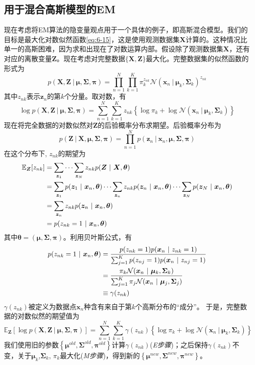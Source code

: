 \documentclass[11pt]{ctexbook}
\begin{document}
\subsection{用于混合高斯模型的EM}
现在考虑将EM算法的隐变量观点用于一个具体的例子，即高斯混合模型。我们的目标是最大化对数似然函数\ref{eq:6-15}，这是使用观测数据集$\bm X$计算的。这种情况比单一的高斯困难，因为求和出现在了对数运算内部。假设除了观测数据集$\bm X$，还有对应的离散变量$\bm Z$。现在考虑对完整数据$\{\bm X, \bm Z\}$最大化。完整数据集的似然函数的形式为
\begin{equation}
	p(\bm X, \bm Z\ |\ \bm \mu, \bm \Sigma, \bm \pi) = \prod_{n=1}^{N}\prod_{k=1}^{K}\pi_k^{z_{nk}}\mathcal N(\bm x_n\ |\ \bm\mu_k, \bm\Sigma_k)^{z_{nk}}
\end{equation}
其中$z_{nk}$表示$\bm z_n$的第$k$个分量。取对数，有
\begin{equation}
	\log p(\bm X, \bm Z\ |\ \bm\mu, \bm\Sigma, \bm\pi) = \sum_{n=1}^{N}\sum_{k=1}^{K}z_{nk}\left\{ \log\pi_k+\log\mathcal N(\bm x_n\ |\ \bm\mu_k, \bm\Sigma_k) \right\}
\end{equation}
现在将完全数据的对数似然对$\bm Z$的后验概率分布求期望。后验概率分布为
\begin{equation}
	p(\bm Z\ |\ \bm X, \bm \mu, \bm\Sigma, \bm\pi) = \prod_{n=1}^{N}p(\bm z_n\ |\ \bm x_n, \bm \mu,\bm\Sigma, \bm\pi)
\end{equation}
在这个分布下, $z_{nk}$的期望为
\begin{align}
	\mathbb E_{\bm Z}[z_{nk}] & = \sum_{\bm z_1}\cdots\sum_{\bm z_N} z_{nk}p(\bm Z\ |\ \bm X, \bm \theta) \notag \\
	& = \sum_{\bm z_1}p(\bm z_1\ |\ \bm x_n, \bm\theta) \cdots \sum_{\bm z_n}z_{nk}p(\bm z_n\ |\ \bm x_n, \bm\theta) \cdots \sum_{\bm z_N}p(\bm z_N\ |\ \bm x_n, \bm\theta) \notag \\
	& = \sum_{\bm z_n}z_{nk}p(\bm z_n\ |\ \bm x_n, \bm\theta) \notag \\
	& = p(z_{nk} = 1\ |\ \bm x_n, \bm\theta)
\end{align}
其中$\bm\theta = (\bm\mu, \bm\Sigma, \bm\pi)$。利用贝叶斯公式，有
\begin{align}
	p(z_{nk}=1\ |\ \bm x_n, \bm\theta) &= \frac{p(z_{nk}=1)p(\bm x_n\ |\ z_{nk}=1)}{\sum_{j=1}^{K}p(z_{nj}=1)p(\bm x_n \ |\ z_{nj}=1)} \notag \\
	& = \frac{\pi_k \mathcal N(\bm x_n\ |\ \bm\mu_k, \bm\Sigma_k)}{\sum_{j=1}^{K}\pi_j\mathcal N(\bm x_n\ |\ \bm\mu_j, \bm\Sigma_j)} \notag \\
	& \equiv \gamma(z_{nk})
\end{align}
$\gamma(z_{nk})$被定义为数据点$\bm x_n$种含有来自于第$k$个高斯分布的“成分”。
于是，完整数据的对数似然的期望值为
\begin{equation}
	\label{eq:gmm-exp}
	\mathbb E_{\bm Z}\left[\log p(\bm X,\bm Z\ |\ \bm\mu,\bm\Sigma,\bm \pi) \right] = \sum_{n=1}^{N}\sum_{k=1}^K\gamma(z_{nk})\left\{\log\pi_k + \log\mathcal N(\bm x_n\ |\ \bm\mu_k, \bm\Sigma_k)\right\}
\end{equation}
我们使用旧的参数$\left\{ \bm\mu^{old}, \bm\Sigma^{old}, \bm\pi^{old} \right\}$计算$\gamma(z_{nk})$(\emph{E步骤})；之后保持$\gamma(z_{nk})$不变，关于$\bm \mu_k$,$ \bm\Sigma_k$, $\pi_k$最大化(\emph{M步骤})，得到新的$\left\{ \bm\mu^{new}, \bm\Sigma^{new}, \bm\pi^{new} \right\}$。
\end{document}
